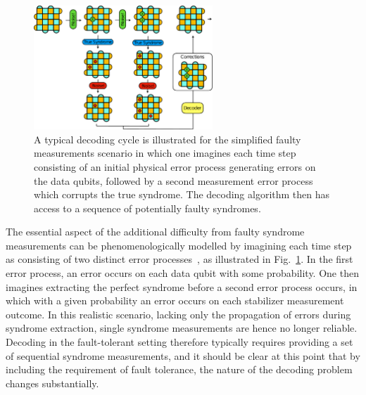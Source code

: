 \documentclass[twocolumn,preprintnumbers,amsmath,amssymb,notitlepage,nofootinbib,longbibliography,superscriptaddress,aps,pra,10pt]{revtex4-1}
\begin{document}
	\begin{figure}
		\centering
		\includegraphics[width=0.6\textwidth]{figures/decoding_problem.pdf}
		\caption{
			A typical decoding cycle is illustrated for the simplified faulty measurements scenario in which one imagines each time step consisting of an initial physical error process generating errors on the data qubits, followed by a second measurement error process which corrupts the true syndrome.
			The decoding algorithm then has access to a sequence of potentially faulty syndromes.
		}
		\label{f:decoding_problem}
	\end{figure}

	The essential aspect of the additional difficulty from faulty syndrome measurements can be phenomenologically modelled by imagining each time step as consisting of two distinct error processes~\cite{stephens2014fault}, as illustrated in Fig.~\ref{f:decoding_problem}.
	In the first error process, an error occurs on each data qubit with some probability.
	One then imagines extracting the perfect syndrome before a second error process occurs, in which with a given probability an error occurs on each stabilizer measurement outcome.
	In this realistic scenario, lacking only the propagation of errors during syndrome extraction, single syndrome measurements are hence no longer reliable.
	Decoding in the fault-tolerant setting therefore typically requires providing a set of sequential syndrome measurements, and it should be clear at this point that by including the requirement of fault tolerance, the nature of the decoding problem changes substantially.
\end{document}
